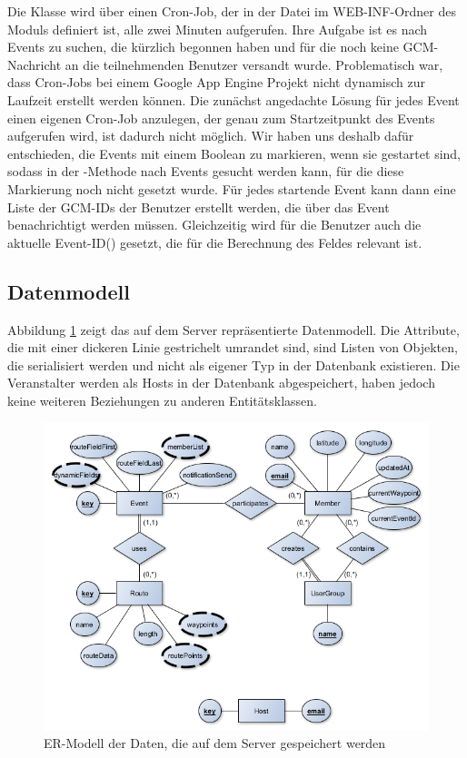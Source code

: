 Die Klasse  wird über einen Cron-Job, der in der Datei  im WEB-INF-Ordner des Moduls definiert ist, alle zwei Minuten aufgerufen. Ihre Aufgabe ist es nach Events zu suchen, die kürzlich begonnen haben und für die noch keine GCM-Nachricht an die teilnehmenden Benutzer versandt wurde. Problematisch war, dass Cron-Jobs bei einem Google App Engine Projekt nicht dynamisch zur Laufzeit erstellt werden können. Die zunächst angedachte Lösung für jedes Event einen eigenen Cron-Job anzulegen, der genau zum Startzeitpunkt des Events aufgerufen wird, ist dadurch nicht möglich. Wir haben uns deshalb dafür entschieden, die Events mit einem Boolean zu markieren, wenn sie gestartet sind, sodass in der -Methode nach Events gesucht werden kann, für die diese Markierung noch nicht gesetzt wurde. Für jedes startende Event kann dann eine Liste der GCM-IDs der Benutzer erstellt werden, die über das Event benachrichtigt werden müssen. Gleichzeitig wird für die Benutzer auch die aktuelle Event-ID() gesetzt, die für die Berechnung des Feldes relevant ist.

\subsection{Datenmodell}
Abbildung \ref{fig:backend_er} zeigt das auf dem Server repräsentierte Datenmodell. Die Attribute, die mit einer dickeren Linie gestrichelt umrandet sind, sind Listen von Objekten, die serialisiert werden und nicht als eigener Typ in der Datenbank existieren. Die Veranstalter werden als Hosts in der Datenbank abgespeichert, haben jedoch keine weiteren Beziehungen zu anderen Entitätsklassen.

\begin{figure}[htb]
\includegraphics[width=\textwidth]{graphics/backend_er.png}
\caption{ER-Modell der Daten, die auf dem Server gespeichert werden}
\label{fig:backend_er}
\end{figure}

